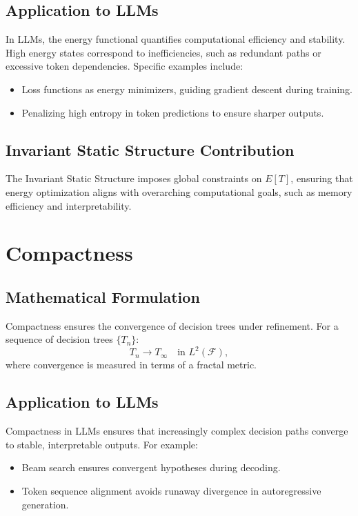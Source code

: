 \documentclass[12pt]{article}
\begin{document}
\subsection{Application to LLMs}
In LLMs, the energy functional quantifies computational efficiency and stability. High energy states correspond to inefficiencies, such as redundant paths or excessive token dependencies. Specific examples include:
\begin{itemize}
    \item Loss functions as energy minimizers, guiding gradient descent during training.
    \item Penalizing high entropy in token predictions to ensure sharper outputs.
\end{itemize}

\subsection{Invariant Static Structure Contribution}
The Invariant Static Structure imposes global constraints on $E[T]$, ensuring that energy optimization aligns with overarching computational goals, such as memory efficiency and interpretability.

\section{Compactness}

\subsection{Mathematical Formulation}
Compactness ensures the convergence of decision trees under refinement. For a sequence of decision trees $\{T_n\}$:
\begin{equation}
T_n \to T_\infty \quad \text{in } L^2(\mathcal{F}),
\end{equation}
where convergence is measured in terms of a fractal metric.

\subsection{Application to LLMs}
Compactness in LLMs ensures that increasingly complex decision paths converge to stable, interpretable outputs. For example:
\begin{itemize}
    \item Beam search ensures convergent hypotheses during decoding.
    \item Token sequence alignment avoids runaway divergence in autoregressive generation.
\end{itemize}
\end{document}
